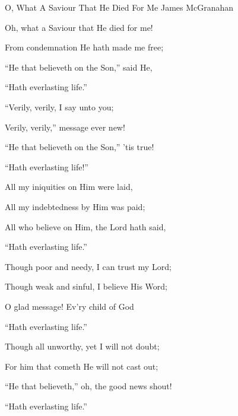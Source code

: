 \documentclass[12pt]{book}
\begin{document}
\begin{song}{O, What A Saviour That He Died For Me}{}
  {\SBPubDom}
  {James McGranahan}
  {}
  {}

  \begin{SBVerse}
    Oh, what a Saviour that He died for me!

    From condemnation He hath made me free;

    ``He that believeth on the Son,'' said He,

    ``Hath everlasting life.''
  \end{SBVerse}

  \begin{SBOpGroup}
    ``Verily, verily, I say unto you;

    Verily, verily,'' message ever new!

    ``He that believeth on the Son,'' 'tis true!

    ``Hath everlasting life!''
  \end{SBOpGroup}

  \begin{SBVerse}
    All my iniquities on Him were laid,

    All my indebtedness by Him was paid;

    All who believe on Him, the Lord hath said,

    ``Hath everlasting life.''
  \end{SBVerse}

  \begin{SBVerse}
    Though poor and needy, I can trust my Lord;

    Though weak and sinful, I believe His Word;

    O glad message! Ev'ry child of God

    ``Hath everlasting life.''
  \end{SBVerse}

  \begin{SBVerse}
    Though all unworthy, yet I will not doubt;

    For him that cometh He will not cast out;

    ``He that believeth,'' oh, the good news shout!

    ``Hath everlasting life.''
  \end{SBVerse}
\end{song}
\end{document}
